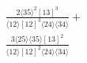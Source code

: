 \documentclass[varwidth, border=5pt]{standalone}
\begin{document}
\begin{my}
$\begin{gathered}
\scriptscriptstyle\frac{2⟨35⟩^2[13]^3}{⟨12⟩[12]^3⟨24⟩⟨34⟩}+\\
\scriptscriptstyle\frac{3⟨25⟩⟨35⟩[13]^2}{⟨12⟩[12]^2⟨24⟩⟨34⟩}\phantom{+}
\end{gathered}$
\end{my}
\end{document}

